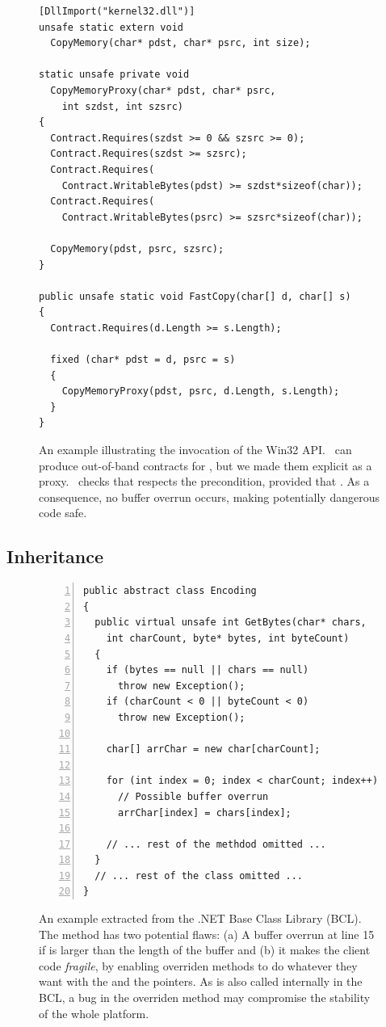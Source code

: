 \documentclass[10pt]{sigplanconf}
\begin{document}
\begin{figure}[t]
\begin{lstlisting}
[DllImport("kernel32.dll")]
unsafe static extern void 
  CopyMemory(char* pdst, char* psrc, int size);

static unsafe private void 
  CopyMemoryProxy(char* pdst, char* psrc, 
    int szdst, int szsrc)
{
  Contract.Requires(szdst >= 0 && szsrc >= 0);
  Contract.Requires(szdst >= szsrc);
  Contract.Requires(
    Contract.WritableBytes(pdst) >= szdst*sizeof(char));
  Contract.Requires(
    Contract.WritableBytes(psrc) >= szsrc*sizeof(char));

  CopyMemory(pdst, psrc, szsrc);
}

public unsafe static void FastCopy(char[] d, char[] s)
{
  Contract.Requires(d.Length >= s.Length);
  
  fixed (char* pdst = d, psrc = s)
  {
    CopyMemoryProxy(pdst, psrc, d.Length, s.Length);
  }
}
\end{lstlisting}
\caption{An example illustrating the invocation of the Win32
API. \Foxtrot\ can produce out-of-band contracts for
, but we made them explicit as a proxy.  \Clousot\
checks that  respects the precondition, provided that
\code{d.Length >= s.Length}.  As a consequence, no buffer overrun
occurs, making potentially dangerous code safe.}
\label{fig:callWindows}
\end{figure}

\subsection{Inheritance}
\begin{figure}[t]
\begin{lstlisting}[numbers=left]
public abstract class Encoding
{ 
  public virtual unsafe int GetBytes(char* chars, 
    int charCount, byte* bytes, int byteCount)
  {
    if (bytes == null || chars == null)
      throw new Exception();             
    if (charCount < 0 || byteCount < 0)
      throw new Exception(); 

    char[] arrChar = new char[charCount];

    for (int index = 0; index < charCount; index++)
      // Possible buffer overrun
      arrChar[index] = chars[index]; 

    // ... rest of the methdod omitted ...
  }
  // ... rest of the class omitted ...
}
\end{lstlisting}
\caption{An example extracted from the .NET Base Class Library
(BCL). The method  has two potential flaws: (a) A
buffer overrun at line 15 if \code{charCount} is larger than the
length of the buffer  and (b) it makes the client code
\emph{fragile}, by enabling overriden methods to do whatever they want
with the \code{chars} and the \code{bytes} pointers.  As
 is also called internally in the BCL, a bug in the
overriden method may compromise the stability of the whole platform.}
\label{fig:system.text}
\end{figure}
\end{document}
